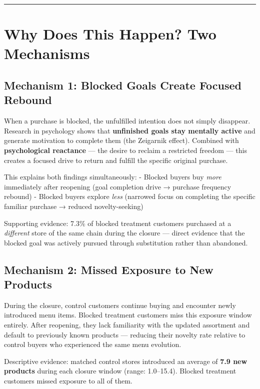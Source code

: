 \documentclass[
  letterpaper,
  DIV=11,
  numbers=noendperiod]{scrartcl}
\begin{document}
\begin{center}\rule{0.5\linewidth}{0.5pt}\end{center}

\section{Why Does This Happen? Two
Mechanisms}\label{why-does-this-happen-two-mechanisms}

\subsection{Mechanism 1: Blocked Goals Create Focused
Rebound}\label{mechanism-1-blocked-goals-create-focused-rebound}

When a purchase is blocked, the unfulfilled intention does not simply
disappear. Research in psychology shows that \textbf{unfinished goals
stay mentally active} and generate motivation to complete them (the
Zeigarnik effect). Combined with \textbf{psychological reactance} ---
the desire to reclaim a restricted freedom --- this creates a focused
drive to return and fulfill the specific original purchase.

This explains both findings simultaneously: - Blocked buyers buy
\emph{more} immediately after reopening (goal completion drive →
purchase frequency rebound) - Blocked buyers explore \emph{less}
(narrowed focus on completing the specific familiar purchase → reduced
novelty-seeking)

Supporting evidence: 7.3\% of blocked treatment customers purchased at a
\emph{different} store of the same chain during the closure --- direct
evidence that the blocked goal was actively pursued through substitution
rather than abandoned.

\subsection{Mechanism 2: Missed Exposure to New
Products}\label{mechanism-2-missed-exposure-to-new-products}

During the closure, control customers continue buying and encounter
newly introduced menu items. Blocked treatment customers miss this
exposure window entirely. After reopening, they lack familiarity with
the updated assortment and default to previously known products ---
reducing their novelty rate relative to control buyers who experienced
the same menu evolution.

Descriptive evidence: matched control stores introduced an average of
\textbf{7.9 new products} during each closure window (range: 1.0--15.4).
Blocked treatment customers missed exposure to all of them.
\end{document}
